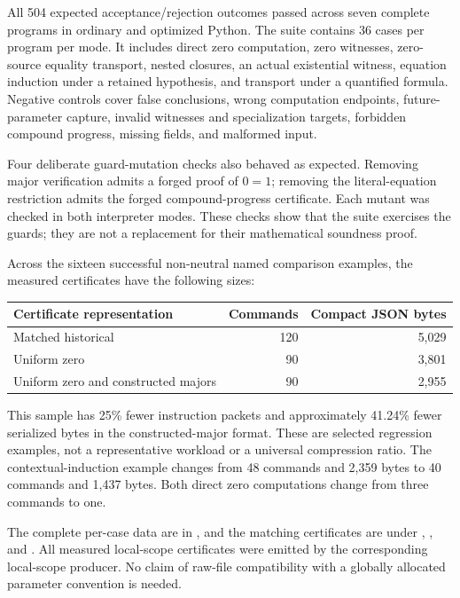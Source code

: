 All 504 expected acceptance/rejection outcomes passed across seven complete
programs in ordinary and optimized Python. The suite contains 36 cases per
program per mode. It includes direct zero computation, zero witnesses,
zero-source equality transport, nested closures, an actual existential
witness, equation induction under a retained hypothesis, and transport under
a quantified formula. Negative controls cover false conclusions, wrong
computation endpoints, future-parameter capture, invalid witnesses and
specialization targets, forbidden compound progress, missing fields, and
malformed input.

Four deliberate guard-mutation checks also behaved as expected. Removing
major verification admits a forged proof of $0=1$; removing the
literal-equation restriction admits the forged compound-progress
certificate. Each mutant was checked in both interpreter modes. These
checks show that the suite exercises the guards; they are not a replacement
for their mathematical soundness proof.

Across the sixteen successful non-neutral named comparison examples, the
measured certificates have the following sizes:
\begin{center}
\begin{tabular}{lrr}
\toprule
Certificate representation & Commands & Compact JSON bytes\\
\midrule
Matched historical & 120 & 5,029\\
Uniform zero & 90 & 3,801\\
Uniform zero and constructed majors & 90 & 2,955\\
\bottomrule
\end{tabular}
\end{center}
This sample has 25\% fewer instruction packets and approximately 41.24\%
fewer serialized bytes in the constructed-major format. These are selected
regression examples, not a representative workload or a universal
compression ratio. The contextual-induction example changes from
48 commands and 2,359 bytes to 40 commands and 1,437 bytes. Both direct
zero computations change from three commands to one.

The complete per-case data are in , and the
matching certificates are under , ,
and . All measured local-scope certificates were
emitted by the corresponding local-scope producer. No claim of raw-file
compatibility with a globally allocated parameter convention is needed.
